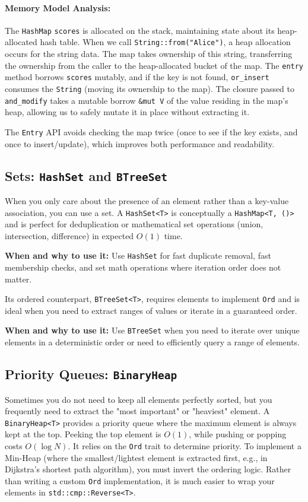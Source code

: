 \paragraph{Memory Model Analysis:}
The \texttt{HashMap} \texttt{scores} is allocated on the stack, maintaining state about its heap-allocated hash table. When we call \texttt{String::from("Alice")}, a heap allocation occurs for the string data. The map takes ownership of this string, transferring the ownership from the caller to the heap-allocated bucket of the map. The \texttt{entry} method borrows \texttt{scores} mutably, and if the key is not found, \texttt{or\_insert} consumes the \texttt{String} (moving its ownership to the map). The closure passed to \texttt{and\_modify} takes a mutable borrow \texttt{\&mut V} of the value residing in the map's heap, allowing us to safely mutate it in place without extracting it.

The \texttt{Entry} API avoids checking the map twice (once to see if the key exists, and once to insert/update), which improves both performance and readability.

\subsection{Sets: \texttt{HashSet} and \texttt{BTreeSet}}
When you only care about the presence of an element rather than a key-value association, you can use a set. A \texttt{HashSet<T>} is conceptually a \texttt{HashMap<T, ()>} and is perfect for deduplication or mathematical set operations (union, intersection, difference) in expected $O(1)$ time.

\textbf{When and why to use it:} Use \texttt{HashSet} for fast duplicate removal, fast membership checks, and set math operations where iteration order does not matter.

Its ordered counterpart, \texttt{BTreeSet<T>}, requires elements to implement \texttt{Ord} and is ideal when you need to extract ranges of values or iterate in a guaranteed order.

\textbf{When and why to use it:} Use \texttt{BTreeSet} when you need to iterate over unique elements in a deterministic order or need to efficiently query a range of elements.

\subsection{Priority Queues: \texttt{BinaryHeap}}
Sometimes you do not need to keep all elements perfectly sorted, but you frequently need to extract the "most important" or "heaviest" element. A \texttt{BinaryHeap<T>} provides a priority queue where the maximum element is always kept at the top. Peeking the top element is $O(1)$, while pushing or popping costs $O(\log N)$. It relies on the \texttt{Ord} trait to determine priority. 
To implement a Min-Heap (where the smallest/lightest element is extracted first, e.g., in Dijkstra's shortest path algorithm), you must invert the ordering logic. Rather than writing a custom \texttt{Ord} implementation, it is much easier to wrap your elements in \texttt{std::cmp::Reverse<T>}.


